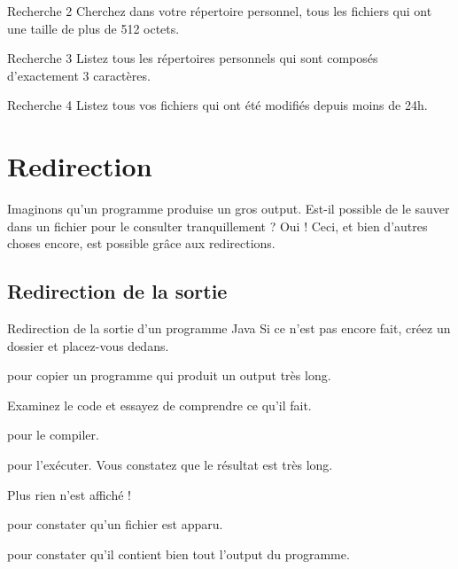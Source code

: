 \documentclass[a4paper,11pt]{style-esi/td}
\begin{document}
	\begin{Exercice}{Recherche 2}
		Cherchez dans votre répertoire personnel,
		tous les fichiers qui ont une taille de plus de 512 octets.
	\end{Exercice}

	\begin{Exercice}{Recherche 3}
		Listez tous les répertoires personnels 
		qui sont composés d'exactement 3 caractères.
	\end{Exercice}

	\begin{Exercice}{Recherche 4}
		Listez tous vos fichiers qui ont été modifiés depuis moins de 24h.
	\end{Exercice}

\newpage

\section{Redirection}

	Imaginons qu'un programme  produise un gros output.
	Est-il possible de le sauver dans un fichier pour le consulter tranquillement ?
	Oui !
	Ceci, et bien d'autres choses encore, est possible grâce aux redirections.

	\subsection{Redirection de la sortie}

		\begin{Experience}{Redirection de la sortie d'un programme Java}
			Si ce n'est pas encore fait,
			créez un dossier  et placez-vous dedans.
			\begin{steps}
			\item 
				pour copier un programme  qui produit un output très long.
			\item 
				Examinez le code et essayez de comprendre ce qu'il fait.
			\item 
				 pour le compiler.
			\item 
				 pour l'exécuter.
				Vous constatez que le résultat est très long.
			\item 
				 Plus rien n'est affiché !
			\item 
				 pour constater qu'un fichier  est apparu.
			\item 
				pour constater qu'il contient bien tout l'output du programme.
			\end{steps}
		\end{Experience}
\end{document}
